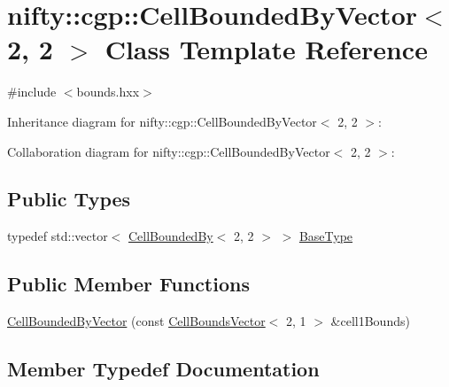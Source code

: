 \hypertarget{classnifty_1_1cgp_1_1CellBoundedByVector_3_012_00_012_01_4}{}\section{nifty\+:\+:cgp\+:\+:Cell\+Bounded\+By\+Vector$<$ 2, 2 $>$ Class Template Reference}
\label{classnifty_1_1cgp_1_1CellBoundedByVector_3_012_00_012_01_4}


{\ttfamily \#include $<$bounds.\+hxx$>$}



Inheritance diagram for nifty\+:\+:cgp\+:\+:Cell\+Bounded\+By\+Vector$<$ 2, 2 $>$\+:


Collaboration diagram for nifty\+:\+:cgp\+:\+:Cell\+Bounded\+By\+Vector$<$ 2, 2 $>$\+:
\subsection*{Public Types}
\begin{DoxyCompactItemize}
\item 
typedef std\+::vector$<$ \hyperlink{classnifty_1_1cgp_1_1CellBoundedBy}{Cell\+Bounded\+By}$<$ 2, 2 $>$ $>$ \hyperlink{classnifty_1_1cgp_1_1CellBoundedByVector_3_012_00_012_01_4_acf1174515755206bce20310f87af4747}{Base\+Type}
\end{DoxyCompactItemize}
\subsection*{Public Member Functions}
\begin{DoxyCompactItemize}
\item 
\hyperlink{classnifty_1_1cgp_1_1CellBoundedByVector_3_012_00_012_01_4_af6f91256e589a2504b9362c4da176893}{Cell\+Bounded\+By\+Vector} (const \hyperlink{classnifty_1_1cgp_1_1CellBoundsVector}{Cell\+Bounds\+Vector}$<$ 2, 1 $>$ \&cell1\+Bounds)
\end{DoxyCompactItemize}


\subsection{Member Typedef Documentation}
\hypertarget{classnifty_1_1cgp_1_1CellBoundedByVector_3_012_00_012_01_4_acf1174515755206bce20310f87af4747}{}
